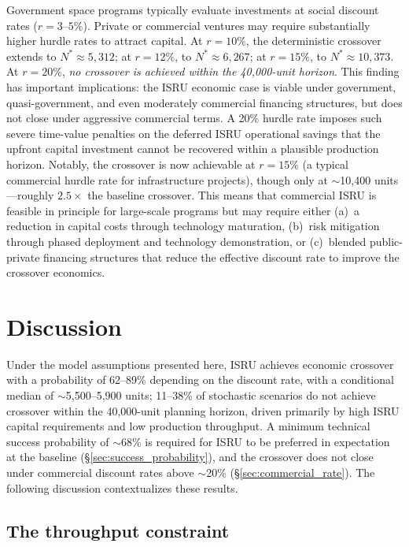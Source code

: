 \documentclass[preprint,12pt]{elsarticle}
\begin{document}
Government space programs typically evaluate investments at social discount rates ($r = 3$--$5\%$). Private or commercial ventures may require substantially higher hurdle rates to attract capital. At $r = 10\%$, the deterministic crossover extends to $N^* \approx 5{,}312$; at $r = 12\%$, to $N^* \approx 6{,}267$; at $r = 15\%$, to $N^* \approx 10{,}373$. At $r = 20\%$, \emph{no crossover is achieved within the 40{,}000-unit horizon}. This finding has important implications: the ISRU economic case is viable under government, quasi-government, and even moderately commercial financing structures, but does not close under aggressive commercial terms. A 20\% hurdle rate imposes such severe time-value penalties on the deferred ISRU operational savings that the upfront capital investment cannot be recovered within a plausible production horizon. Notably, the crossover is now achievable at $r = 15\%$ (a typical commercial hurdle rate for infrastructure projects), though only at $\sim$10{,}400 units---roughly $2.5\times$ the baseline crossover. This means that commercial ISRU is feasible in principle for large-scale programs but may require either (a)~a reduction in capital costs through technology maturation, (b)~risk mitigation through phased deployment and technology demonstration, or (c)~blended public-private financing structures that reduce the effective discount rate to improve the crossover economics.

\section{Discussion}
\label{sec:discussion}

Under the model assumptions presented here, ISRU achieves economic crossover with a probability of 62--89\% depending on the discount rate, with a conditional median of $\sim$5{,}500--5{,}900 units; 11--38\% of stochastic scenarios do not achieve crossover within the 40{,}000-unit planning horizon, driven primarily by high ISRU capital requirements and low production throughput. A minimum technical success probability of $\sim$68\% is required for ISRU to be preferred in expectation at the baseline (\S\ref{sec:success_probability}), and the crossover does not close under commercial discount rates above $\sim$20\% (\S\ref{sec:commercial_rate}). The following discussion contextualizes these results.

\subsection{The throughput constraint}
\label{sec:throughput}
\end{document}
